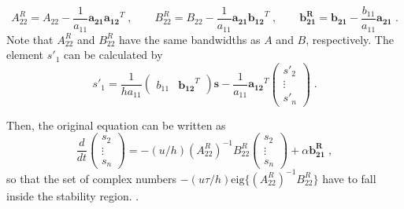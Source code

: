 {\begin{equation}
  A^R_{22}=A_{22}-\frac{1}{a_{11}}\mathbf{a_{21}}\mathbf{a_{12}}^T \;,\qquad
  B^R_{22}=B_{22}-\frac{1}{a_{11}}\mathbf{a_{21}}\mathbf{b_{12}}^T \;,\qquad
  \mathbf{b^R_{21}}=\mathbf{b_{21}}-\frac{b_{11}}{a_{11}}\mathbf{a_{21}} \;.
\end{equation}
Note that $A^R_{22}$ and $B^R_{22}$ have the same bandwidths as $A$ and $B$, respectively. The element $s'_1$ can be calculated by
\begin{equation}
  s'_1=\frac{1}{ha_{11}}
  \left(\begin{array}{cc}b_{11}\!&\!\mathbf{b_{12}}^T\end{array}\right)
  \mathbf{s} - \frac{1}{a_{11}}
  \mathbf{a_{12}}^T \left(\begin{array}{c}s'_2\\\vdots\\s'_n\end{array}\right)\;.
\end{equation}


Then, the original equation can be written as
\begin{equation}
  \frac{d}{dt}
  \left(\begin{array}{c}s_2\\\vdots\\s_n\end{array}\right) =
  -(u/h)(A^R_{22})^{-1}B^R_{22}\left(\begin{array}{c}s_2\\\vdots\\s_n\end{array}\right)+
  \alpha\mathbf{b^R_{21}} \;,
\end{equation}
so that the set of complex numbers $-(u\tau/h) \textrm{eig} \{(A^R_{22})^{-1}B^R_{22}\}$ have to fall inside the stability region. \citep{Carpenter:1993}.

}

